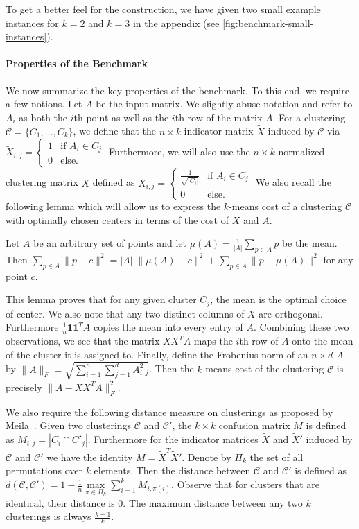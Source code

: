 To get a better feel for the construction, we have given two small example instances for $k=2$ and $k=3$ in the appendix (see \cref{fig:benchmark-small-instances}).


\paragraph*{Properties of the Benchmark}

We now summarize the key properties of the benchmark.
To this end, we require a few notions.
Let $A$ be the input matrix. We slightly abuse notation and refer to $A_i$ as both the $i$th point as well as the $i$th row of the matrix $A$.
For a clustering $\mathcal{C}=\{C_1,\ldots ,C_k\}$, we define that the $n\times k$ indicator matrix $\tilde X$ induced by $\mathcal{C}$ via $\tilde X_{i,j} = \begin{cases}1 & \text{if } A_i\in C_j \\
0 & \text{else.} \end{cases}$
Furthermore, we will also use the $n\times k$ normalized clustering matrix $ X$ defined as
$X_{i,j} = \begin{cases}\frac{1}{\sqrt{|C_i|}} & \text{if } A_i\in C_j \\
0 & \text{else.} \end{cases}$
We also recall the following lemma which will allow us to express the $k$-means cost of a clustering $\mathcal{C}$ with optimally chosen centers in terms of the cost of $X$ and $A$.
\begin{lemma}[Folklore]
\label{lem:magic}
Let $A$ be an arbitrary set of points and let $\mu(A) = \frac{1}{|A|}\sum_{p\in A} p$ be the mean. Then $ \sum_{p\in A} \|p-c\|^2 = |A|\cdot \|\mu(A)-c\|^2 + \sum_{p\in A} \|p-\mu(A)\|^2$ for any point $c$.
\end{lemma}
This lemma proves that for any given cluster $C_j$, the mean is the optimal choice of center. 
We also note that any two distinct columns of $X$ are orthogonal. Furthermore $\frac{1}{n}\mathbf{1}\mathbf{1}^TA$ copies the mean into every entry of $A$. Combining these two observations, we see that the matrix $XX^TA$ maps the $i$th row of $A$ onto the mean of the cluster it is assigned to. Finally, define the Frobenius norm of an $n\times d$ $A$ by $\|A\|_F = \sqrt{\sum_{i=1}^n\sum_{j=1}^d A_{i,j}^2}$. Then the $k$-means cost of the clustering $\mathcal{C}$ is precisely
$\|A-XX^TA\|_F^2.$

We also require the following distance measure on clusterings as proposed by Meila~\cite{Meila05,Meila06}. Given two clusterings $\mathcal{C}$ and $\mathcal{C'}$, the $k\times k$ confusion matrix $M$ is defined as
$ M_{i,j} = |C_i\cap C'_j|.$
Furthermore for the indicator matrices $\tilde X$ and $\tilde X'$ induced by $\mathcal{C}$ and $\mathcal{C'}$ we have the identity $M=\tilde X^T {\tilde X'}$.
Denote by $\Pi_k$ the set of all permutations over $k$ elements. Then the distance between  $\mathcal{C}$ and $\mathcal{C'}$ is defined as $d(\mathcal{C},\mathcal{C'}) = 1-\frac{1}{n}\underset{\pi\in \Pi_k}{\max} \sum_{i=1}^k M_{i,\pi(i)}.$
Observe that for clusters that are identical, their distance is $0$. The maximum distance between any two $k$ clusterings is always $\frac{k-1}{k}$.

